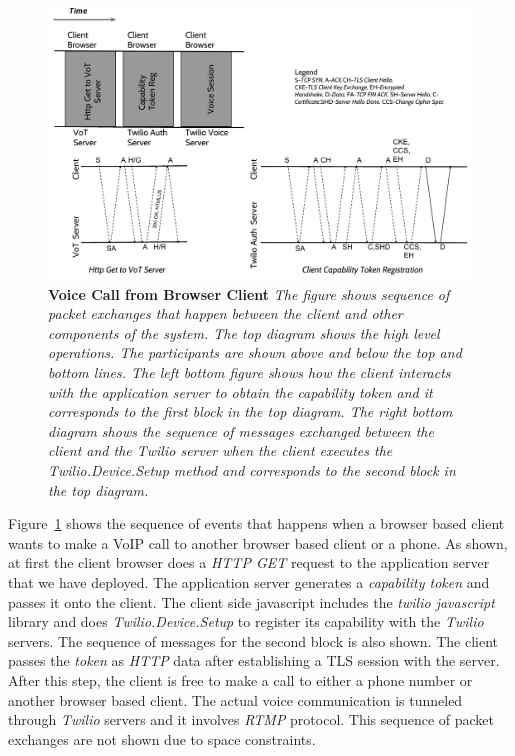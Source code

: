 \begin{figure}[t!] \centering
\includegraphics[width=\textwidth]{figs/voicecallpacketlevel.pdf}
\caption{\textbf{Voice Call from Browser Client} {\footnotesize\textit{
The figure shows sequence of packet exchanges that happen between the client and other components of the system. The top diagram shows the high level operations. The participants are shown above and below the top and bottom lines. The left bottom figure shows how the client interacts with the application server to obtain the \textit{capability token} and it corresponds to the first block in the top diagram. The right bottom diagram shows the sequence of messages exchanged between the client and the \textit{Twilio} server when the client executes the \textit{Twilio.Device.Setup} method and corresponds to the second block in the top diagram.  
}}}
\label{fig:messagelevel}
\end{figure}

Figure~\ref{fig:messagelevel} shows the sequence of events that happens when a browser based client wants to make a VoIP call to another browser based client or a phone. As shown, at first the client browser does a \textit{HTTP GET} request to the application server that we have deployed. The application server generates a \textit{capability token} and passes it onto the client. The client side javascript includes the \textit{twilio javascript} library and does \textit{Twilio.Device.Setup} to register its capability with the \textit{Twilio} servers. The sequence of messages for the second block is also shown. The client passes the \textit{token} as \textit{HTTP} data after establishing a TLS session with the server. After this step, the client is free to make a call to either a phone number or another browser based client. The actual voice communication is tunneled through \textit{Twilio} servers and it involves \textit{RTMP} protocol. This sequence of packet exchanges are not shown due to space constraints. 
